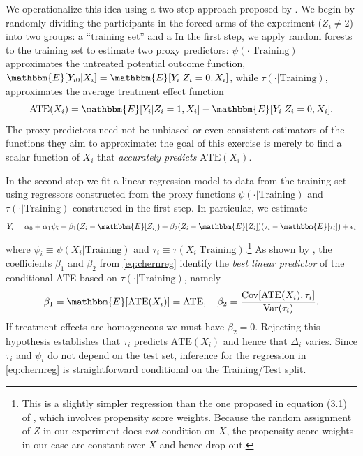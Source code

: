 We operationalize this idea using a two-step approach proposed by \cite{chernozhukov2018generic}.  We begin by randomly dividing the participants in the forced arms of the experiment ($Z_i \neq 2$) into two groups: a ``training set'' and a  In the first step, we apply random forests to the training set to estimate two proxy predictors: $\psi(\cdot|\text{Training})$ approximates the untreated potential outcome function, $\mathbbm{E}[Y_{i0}|X_i] = \mathbbm{E}[Y_i|Z_i=0,X_i]$, while  $\tau(\cdot|\text{Training})$, approximates the average treatment effect function
\[
\text{ATE}(X_i) = \mathbbm{E}[Y_i|Z_i=1,X_i] - \mathbbm{E}[Y_i|Z_i=0, X_i].
\]
The proxy predictors need not be unbiased or even consistent estimators of the functions they aim to approximate: the goal of this exercise is merely to find a scalar function of $X_i$ that \emph{accurately predicts} $\text{ATE}(X_i)$.

In the second step we fit a linear regression model to data from the training set using regressors constructed from the proxy functions $\psi(\cdot|\text{Training})$ and $\tau(\cdot|\text{Training})$ constructed in the first step. In particular, we estimate 
\begin{equation}
Y_i = \alpha_0 + \alpha_1 \psi_i + \beta_1 (Z_i - \mathbbm{E}[Z_i]) + \beta_2 (Z_i - \mathbbm{E}[Z_i])(\tau_i - \mathbbm{E}[\tau_i]) + \epsilon_i
\label{eq:chernreg}
\end{equation}
where $\psi_i \equiv \psi(X_i|\text{Training})$ and $\tau_i \equiv \tau(X_i|\text{Training})$.\footnote{This is a slightly simpler regression than the one proposed in equation (3.1) of \cite{chernozhukov2018generic}, which involves propensity score weights. Because the random assignment of $Z$ in our experiment does \emph{not} condition on $X$, the propensity score weights in our case are constant over $X$ and hence drop out.} As shown by \cite{chernozhukov2018generic}, the coefficients $\beta_1$ and $\beta_2$ from \eqref{eq:chernreg} identify the \emph{best linear predictor} of the conditional ATE based on $\tau(\cdot|\text{Training})$, namely
\[
\beta_1 = \mathbbm{E}[\text{ATE}(X_i)] = \text{ATE}, \quad
\beta_2 = \frac{\text{Cov}[\text{ATE}(X_i), \tau_i]}{\text{Var}(\tau_i)}.
\]
If treatment effects are homogeneous we must have $\beta_2 = 0$. Rejecting this hypothesis establishes that $\tau_i$ predicts $\text{ATE}(X_i)$ and hence that $\Delta_i$ varies. Since $\tau_i$ and $\psi_i$ do not depend on the test set, inference for the regression in \eqref{eq:chernreg} is straightforward conditional on the Training/Test split.  

